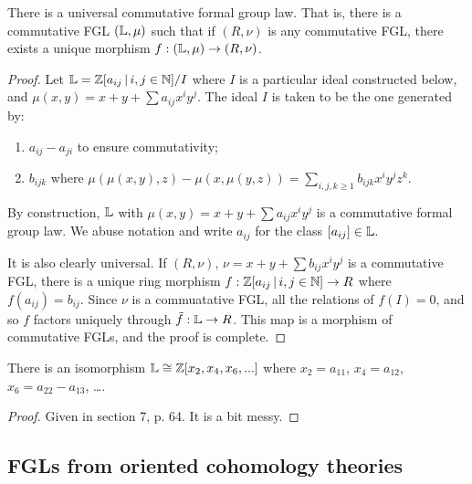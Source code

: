 \documentclass{article}%
\begin{document}
\begin{theorem}
There is a universal commutative formal group law. That is, there is a
commutative FGL $(\mathbb{L},\mu)$ such that if $(R,\nu)$ is any commutative
FGL, there exists a unique morphism $f: (\mathbb{L},\mu)\rightarrow
(R,\nu)$. 
\end{theorem}

\begin{proof}
Let $\mathbb{L}=\mathbb{Z}[a_{ij} \, \vert \, i,j \in \mathbb{N} ]/I$ where $I$ is a particular
ideal constructed below, and $\mu(x,y)=x+y+\sum a_{ij}x^iy^j$. The
ideal $I$ is taken to be the one generated by:
\begin{enumerate}
\item $a_{ij}-a_{ji}$ to ensure commutativity;
\item $b_{ijk}$ where $\mu(\mu(x,y),z)-\mu(x,\mu(y,z)) =
\sum_{i,j,k\geq 1} b_{ijk}x^iy^jz^k$.
\end{enumerate}
By construction, $\mathbb{L}$ with $\mu(x,y)=x+y+\sum a_{ij}x^iy^j$ is a
commutative formal group law. We abuse notation and write $a_{ij}$ for
the class $[a_{ij}] \in \mathbb{L}$.

It is also clearly universal. If $(R,\nu)$, $\nu = x+y + \sum
b_{ij}x^iy^j$ is a commutative FGL, there is a unique ring morphism $f
: \mathbb{Z}[a_{ij} \, \vert \, i,j \in \mathbb{N} ] \rightarrow R$ where $f(a_{ij}) =
b_{ij}$. Since $\nu$ is a commuatative FGL, all the relations of
$f(I)=0$, and so $f$ factors uniquely through $\tilde{f}: \mathbb{L}
\rightarrow R$. This map is a morphism of commutative FGLs, and the
proof is complete.
\end{proof}

\begin{theorem}
There is an isomorphism $\mathbb{L} \cong \mathbb{Z}[x_2,x_4,x_6,...]$ where
$x_2=a_{11}$, $x_4=a_{12}$, $x_6=a_{22}-a_{13}$, \ldots.
\end{theorem}

\begin{proof} Given in section 7, p. 64. It is a bit messy. 
\end{proof}


\subsection{ FGLs from oriented cohomology theories}
\end{document}
